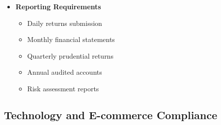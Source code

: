 \begin{tcolorbox}[
    colback=white,
    colframe=primarydark,
    title=\textbf{Central Bank of Nigeria (CBN) Requirements},
    before skip=1em,
    after skip=1em
]
\begin{itemize}[leftmargin=*,itemsep=0.5em]
        \item \textbf{Reporting Requirements}
        \begin{itemize}[itemsep=0.3em]
            \item Daily returns submission
            \item Monthly financial statements
            \item Quarterly prudential returns
            \item Annual audited accounts
            \item Risk assessment reports
        \end{itemize}
    \end{itemize}
\end{tcolorbox}

\subsection{Technology and E-commerce Compliance}\label{subsec:tech-compliance}
\vspace{1em}

